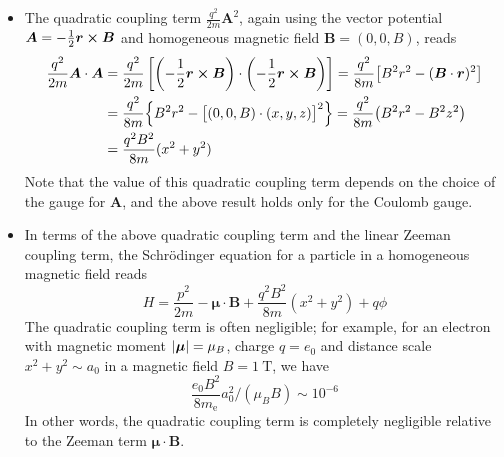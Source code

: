 \documentclass[11pt, a4paper]{article}
\newcommand{\Schro}{Schr\"{o}dinger\xspace}
\renewcommand{\vec}[1]{\bm{#1}}  %
\renewcommand{\r}{\vec{r}}  %
\newcommand{\A}{\vec{A}}  %
\newcommand{\B}{\vec{B}}  %
\newcommand{\m}{\vec{\mu}}  %
\begin{document}
\begin{itemize}
	\item The quadratic coupling term $ \frac{q^{2}}{2m}\A^{2} $, again using the vector potential $ \A = -\frac{1}{2}\r \cross \vec{B} $ and homogeneous magnetic field $ \B = (0, 0, B) $, reads
	\begin{align*}
		\frac{q^{2}}{2m} \A \cdot \A &= \frac{q^{2}}{2m}\left[\left(-\frac{1}{2}\r \cross \vec{B}\right) \cdot \left(-\frac{1}{2}\r \cross \vec{B}\right)\right] = \frac{q^{2}}{8m}\big[B^{2}r^{2} - (\B \cdot \r)^{2}\big]\\
		& = \frac{q^{2}}{8m}\Big\{ B^{2}r^{2} - \big[(0, 0, B)\cdot (x, y, z)\big]^{2}\Big\} = \frac{q^{2}}{8m} \big(B^{2}r^{2} - B^{2}z^{2}\big)\\
		& = \frac{q^{2}B^{2}}{8m}(x^{2} + y^{2})
	\end{align*}
	Note that the value of this quadratic coupling term depends on the choice of the gauge for $ \A $, and the above result holds only for the Coulomb gauge.
	
	\item In terms of the above quadratic coupling term and the linear Zeeman coupling term, the \Schro equation for a particle in a homogeneous magnetic field reads
	\begin{equation*}
		H = \frac{p^{2}}{2m} - \m \cdot \B + \frac{q^{2}B^{2}}{8m}(x^{2} + y^{2}) + q\phi
	\end{equation*}
	The quadratic coupling term is often negligible; for example, for an electron with magnetic moment $ \abs{\m} = \mu_{B}$, charge $ q = e_{0} $ and distance scale $ x^{2} + y^{2} \sim a_{0} $ in a magnetic field $ B = \SI{1}{\tesla} $, we have
	\begin{equation*}
		\frac{e_{0}B^{2}}{8m_{\text{e}}}a_{0}^{2} \Big / (\mu_{B}B) \sim 10^{-6}
	\end{equation*}
	In other words, the quadratic coupling term is completely negligible relative to the Zeeman term $ \m \cdot \B $. 
\end{itemize}
\end{document}
